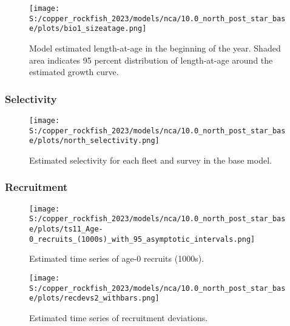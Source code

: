\documentclass[11pt,
  letterpaper,
]{article}
\begin{document}
\begin{figure}
{\centering
\texttt{[image: S:/copper\_rockfish\_2023/models/nca/10.0\_north\_post\_star\_base/plots/bio1\_sizeatage.png]}
}
\caption{Model estimated length-at-age in the beginning of the year. Shaded area indicates 95 percent distribution of length-at-age around the estimated growth curve.\label{fig:mod-est-len-age}}
\end{figure}

\pagebreak

\subsubsection{Selectivity}\label{selectivity}

\begin{figure}
{\centering
\texttt{[image: S:/copper\_rockfish\_2023/models/nca/10.0\_north\_post\_star\_base/plots/north\_selectivity.png]}
}
\caption{Estimated selectivity for each fleet and survey in the base model.\label{fig:est-selex}}
\end{figure}

\pagebreak

\subsubsection{Recruitment}\label{recruitment-1}

\begin{figure}
{\centering
\texttt{[image: S:/copper\_rockfish\_2023/models/nca/10.0\_north\_post\_star\_base/plots/ts11\_Age-0\_recruits\_(1000s)\_with\_95\_asymptotic\_intervals.png]}
}
\caption{Estimated time series of age-0 recruits (1000s).\label{fig:recruits}}
\end{figure}

\pagebreak

\begin{figure}
{\centering
\texttt{[image: S:/copper\_rockfish\_2023/models/nca/10.0\_north\_post\_star\_base/plots/recdevs2\_withbars.png]}
}
\caption{Estimated time series of recruitment deviations.\label{fig:rec-devs}}
\end{figure}
\end{document}
